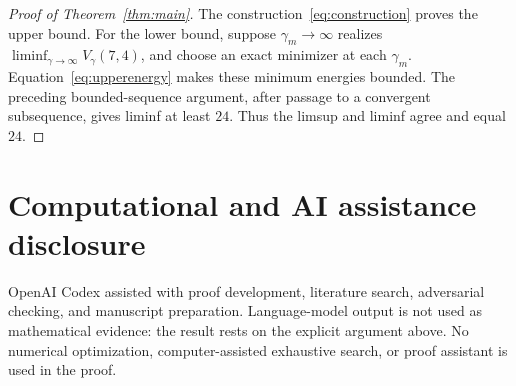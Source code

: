 \documentclass[11pt]{article}
\begin{document}
\begin{proof}[Proof of Theorem~\ref{thm:main}]
The construction~\eqref{eq:construction} proves the upper bound.  For the
lower bound, suppose $\gamma_m\to\infty$ realizes
$\liminf_{\gamma\to\infty}V_\gamma(7,4)$, and choose an exact minimizer at
each $\gamma_m$.  Equation~\eqref{eq:upperenergy} makes these minimum energies
bounded.  The preceding bounded-sequence argument, after passage to a
convergent subsequence, gives liminf at least $24$.  Thus the limsup and
liminf agree and equal $24$.
\end{proof}

\section*{Computational and AI assistance disclosure}

OpenAI Codex assisted with proof development, literature search, adversarial
checking, and manuscript preparation.  Language-model output is not used as
mathematical evidence: the result rests on the explicit argument above.  No
numerical optimization, computer-assisted exhaustive search, or proof
assistant is used in the proof.

\printbibliography
\end{document}
